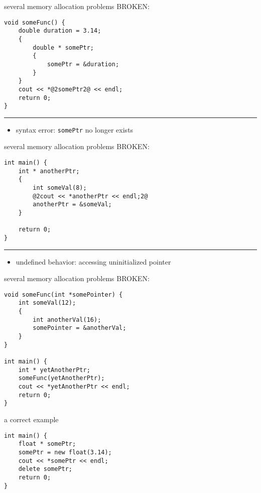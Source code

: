 \begin{frame}[fragile,label=someMemAllocProbsC]{several memory allocation problems}
BROKEN:
\begin{lstlisting}
void someFunc() {
    double duration = 3.14;
    {
        double * somePtr;
        {
            somePtr = &duration;
        }
    }
    cout << *@2somePtr2@ << endl;
    return 0;
}
\end{lstlisting}
\hrule
\begin{itemize}
\item<2-> syntax error: \texttt{somePtr} no longer exists
\end{itemize}
\end{frame}

\begin{frame}[fragile,label=someMemAllocProbsD]{several memory allocation problems}
BROKEN:
\begin{lstlisting}
int main() {
    int * anotherPtr;
    {
        int someVal(8);
        @2cout << *anotherPtr << endl;2@
        anotherPtr = &someVal;
    }

    return 0;
}
\end{lstlisting}
\hrule
\begin{itemize}
\item<2-> undefined behavior: accessing uninitialized pointer
\end{itemize}
\end{frame}

\begin{frame}[fragile,label=someMemAllocProbsE]{several memory allocation problems}
BROKEN:
\begin{lstlisting}
void someFunc(int *somePointer) {
    int someVal(12);
    {
        int anotherVal(16);
        somePointer = &anotherVal;
    }
}

int main() {
    int * yetAnotherPtr;
    someFunc(yetAnotherPtr);
    cout << *yetAnotherPtr << endl;
    return 0;
}
\end{lstlisting}
\end{frame}

\begin{frame}[fragile,label=someMemAllocProbsF]{a correct example}
\begin{lstlisting}
int main() {
    float * somePtr;
    somePtr = new float(3.14);
    cout << *somePtr << endl;
    delete somePtr;
    return 0;
}
\end{lstlisting}
\end{frame}

